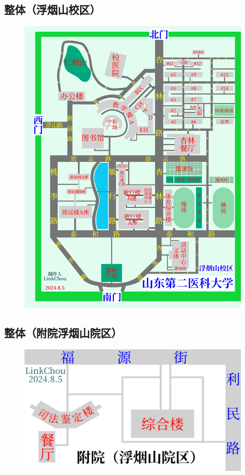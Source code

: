 \subsection[整体（浮烟山校区）]{整体（浮烟山校区）}
\begin{figure}[H]
    \centering
    \includegraphics*[width=\textwidth]{resources/map/浮烟山校区简图.pdf}
    \label{map_fuyanshan_holistic}
\end{figure}

\newpage
\subsection[整体（附院浮烟山院区）]{整体（附院浮烟山院区）}
\begin{figure}[H]
    \centering
    \includegraphics*[angle=90,height=0.9\textheight]{resources/map/附院_浮烟山院区.pdf}
    \label{map_affiliated_hospital_fuyanshan}
\end{figure}

\newpage